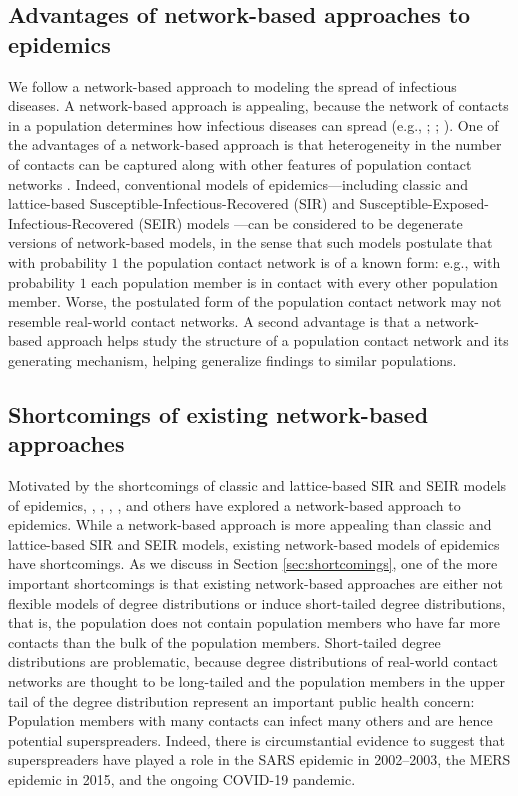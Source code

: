 \documentclass[12pt,usenatbib,referee]{article}
\begin{document}
\subsection{Advantages of network-based approaches to epidemics}

We follow a network-based approach to modeling the spread of infectious diseases.\linebreak
A network-based approach is appealing,
because the network of contacts in a population determines how infectious diseases can spread (e.g., \citeauthor{KeEa05} \citeyear{KeEa05}; \citeauthor{Daetal11} \citeyear{Daetal11}; \citeauthor*{WeBaHu11} \citeyear{WeBaHu11}).
One of the advantages of a network-based approach is that heterogeneity in the number of contacts can be captured \citep[e.g.,][]{Daetal11} along with other features of population contact networks \citep[e.g.,][]{WeBaHu11}.
Indeed,
conventional models of epidemics---including classic and lattice-based Susceptible-Infectious-Recovered (SIR) and Susceptible-Exposed-Infectious-Recovered (SEIR) models \citep[e.g.,][]{AnBr00,Daetal11}---can be considered to be degenerate versions of network-based models,
in the sense that such models postulate that with probability $1$ the population contact network is of a known form:
e.g.,
with probability $1$ each population member is in contact with every other population member.
Worse,
the postulated form of the population contact network may not resemble real-world contact networks.
A second advantage is that a network-based approach helps study the structure of a population contact network and its generating mechanism,
helping generalize findings to similar populations.

\subsection{Shortcomings of existing network-based approaches}

Motivated by the shortcomings of classic and lattice-based SIR and SEIR models of epidemics,
\citet{BrNe02},
\citet*{GrWeHu10,GrWeHu11},
\citet{epinet.jss},
\citet*{Buetal21},
and others have explored a network-based approach to epidemics.
While a network-based approach is more appealing than classic and lattice-based SIR and SEIR models,
existing network-based models of epidemics have shortcomings.
As we discuss in Section \ref{sec:shortcomings}, 
one of the more important shortcomings is that existing network-based approaches are either not flexible models of degree distributions or induce short-tailed degree distributions,
that is,
the population does not contain population members who have far more contacts than the bulk of the population members.
Short-tailed degree distributions are problematic,
because degree distributions of real-world contact networks are thought to be long-tailed \citep*[e.g.,][]{La94,AlBa02,JoHa04,JoHa03,HaJo04} and the population members in the upper tail of the degree distribution represent an important public health concern:
Population members with many contacts can infect many others and are hence potential superspreaders.
Indeed,
there is circumstantial evidence to suggest that superspreaders have played a role in the SARS epidemic in 2002--2003, the MERS epidemic in 2015, and the ongoing COVID-19 pandemic.
\end{document}

